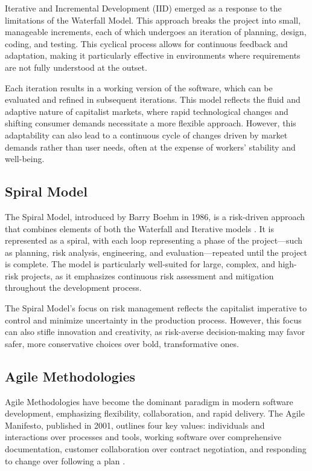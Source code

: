 \begin{refsection}
\begin{multicols}{2}
{Iterative and Incremental Development (IID) emerged as a response to the limitations of the Waterfall Model. This approach breaks the project into small, manageable increments, each of which undergoes an iteration of planning, design, coding, and testing. This cyclical process allows for continuous feedback and adaptation, making it particularly effective in environments where requirements are not fully understood at the outset.

Each iteration results in a working version of the software, which can be evaluated and refined in subsequent iterations. This model reflects the fluid and adaptive nature of capitalist markets, where rapid technological changes and shifting consumer demands necessitate a more flexible approach. However, this adaptability can also lead to a continuous cycle of changes driven by market demands rather than user needs, often at the expense of workers' stability and well-being.

\subsection{Spiral Model}

The Spiral Model, introduced by Barry Boehm in 1986, is a risk-driven approach that combines elements of both the Waterfall and Iterative models \cite[p. 14]{boehm1986}. It is represented as a spiral, with each loop representing a phase of the project—such as planning, risk analysis, engineering, and evaluation—repeated until the project is complete. The model is particularly well-suited for large, complex, and high-risk projects, as it emphasizes continuous risk assessment and mitigation throughout the development process.

The Spiral Model's focus on risk management reflects the capitalist imperative to control and minimize uncertainty in the production process. However, this focus can also stifle innovation and creativity, as risk-averse decision-making may favor safer, more conservative choices over bold, transformative ones.

\subsection{Agile Methodologies}

Agile Methodologies have become the dominant paradigm in modern software development, emphasizing flexibility, collaboration, and rapid delivery. The Agile Manifesto, published in 2001, outlines four key values: individuals and interactions over processes and tools, working software over comprehensive documentation, customer collaboration over contract negotiation, and responding to change over following a plan \cite{beck2001}.

}
\end{multicols}
\end{refsection}
